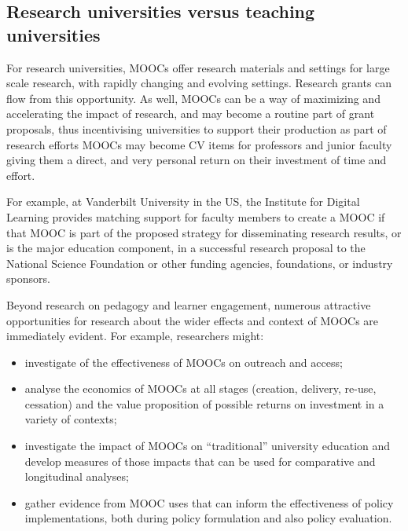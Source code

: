 \subsection{Research universities versus teaching universities}


For research universities, MOOCs offer research materials and settings
for large scale research, with rapidly changing and evolving
settings. Research grants can flow from this opportunity.
As well, MOOCs can be a way of maximizing and accelerating the impact of
research, and may become a routine part of grant proposals, thus
incentivising universities to support their production as part of research
efforts MOOCs may become CV items for professors and junior faculty
giving them a direct, and very personal return on their investment of time and effort.

For example, at Vanderbilt University in the US, the Institute for
Digital Learning provides matching support for faculty members to create a
MOOC if that MOOC is part of the proposed strategy for disseminating
research results, or is the major education component, in a successful research
proposal to the National
Science Foundation or other funding agencies, foundations, or industry sponsors.

Beyond research on pedagogy and learner engagement, numerous attractive
opportunities for research about the wider effects and context of MOOCs
are immediately evident.  For example, researchers might:

\begin{itemize}

\item investigate of the effectiveness of MOOCs on outreach and access;

\item analyse the economics of MOOCs at all stages (creation, delivery,
re-use, cessation) and the value proposition of possible returns on
investment in a variety of contexts;  

\item investigate the impact of MOOCs on
``traditional'' university education and develop measures of those impacts
that can be used for comparative and longitudinal analyses;

\item gather evidence from MOOC uses that can inform the effectiveness of policy implementations,
  both during policy formulation and also policy evaluation.

\end{itemize}

